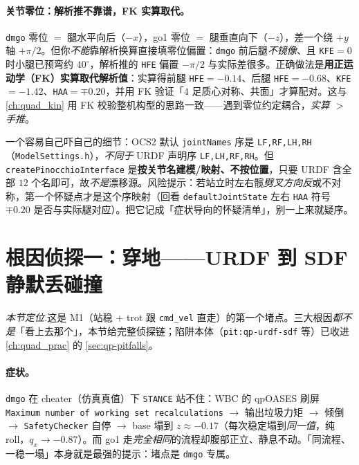 \paragraph{关节零位：解析推不靠谱，FK 实算取代。}
\texttt{dmgo} 零位 $=$ 腿水平向后（$-x$），go1 零位 $=$ 腿垂直向下（$-z$），差一个绕 $+y$ 轴 $+\pi/2$。但你\emph{不能}靠解析换算直接填零位偏置：\texttt{dmgo} 前后腿\emph{不镜像}、且 \texttt{KFE}$=0$ 时小腿已预弯约 $40^\circ$，解析推的 \texttt{HFE} 偏置 $-\pi/2$ 与实际差很多。正确做法是\textbf{用正运动学（FK）实算取代解析值}：实算得前腿 \texttt{HFE}$=-0.14$、后腿 \texttt{HFE}$=-0.68$、\texttt{KFE}$=-1.42$、\texttt{HAA}$=\mp0.20$，并用 FK 验证「$4$ 足质心对称、共面」才算配对。这与 \cref{ch:quad_kin} 用 FK 校验整机构型的思路一致——遇到零位约定耦合，\emph{实算 $>$ 手推}。

\begin{note}\label{note:qadv-jointorder}
一个容易自己吓自己的细节：OCS2 默认 \texttt{jointNames} 序是 \texttt{LF,RF,LH,RH}（\texttt{ModelSettings.\allowbreak h}），\emph{不同于} URDF 声明序 \texttt{LF,LH,RF,RH}。但 \texttt{createPinocchioInterface} 是\textbf{按关节名建模/映射、不按位置}，只要 URDF 含全部 $12$ 个名即可，故\emph{不是}漂移源。风险提示：若站立时左右髋\emph{劈叉方向反}或不对称，第一个怀疑点才是这个序映射（回看 \texttt{defaultJointState} 左右 \texttt{HAA} 符号 $\mp0.20$ 是否与实际腿对应）。把它记成「症状导向的怀疑清单」，别一上来就疑序。
\end{note}

\section{根因侦探一：穿地——URDF 到 SDF 静默丢碰撞}
\label{sec:qadv-rc1}

\noindent\emph{本节定位.}\;这是 M1（站稳 + trot 跟 \texttt{cmd\_vel} 直走）的第一个堵点。三大根因\emph{都不是}「看上去那个」，本节给完整侦探链；陷阱本体（\texttt{pit:qp-urdf-sdf} 等）已收进 \cref{ch:quad_prac} 的 \cref{sec:qp-pitfalls}。

\paragraph{症状。}
\texttt{dmgo} 在 cheater（仿真真值）下 \texttt{STANCE} 站不住：WBC 的 qpOASES 刷屏 \texttt{Maximum number of working set recalculations} $\to$ 输出垃圾力矩 $\to$ 倾倒 $\to$ \texttt{SafetyChecker} 自停 $\to$ base 塌到 $z\approx-0.17$（每次稳定塌到\emph{同一值}，纯 roll，$q_x\to-0.87$）。而 go1 走\emph{完全相同}的流程却腹部正立、静息不动。「同流程、一稳一塌」本身就是最强的提示：堵点是 \texttt{dmgo} 专属。

